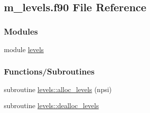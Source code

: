 \hypertarget{m__levels_8f90}{}\subsection{m\+\_\+levels.\+f90 File Reference}
\label{m__levels_8f90}
\subsubsection*{Modules}
\begin{DoxyCompactItemize}
\item 
module \hyperlink{namespacelevels}{levels}
\end{DoxyCompactItemize}
\subsubsection*{Functions/\+Subroutines}
\begin{DoxyCompactItemize}
\item 
subroutine \hyperlink{namespacelevels_ab6baa988e04debfb3d1dccc8918168e6}{levels\+::alloc\+\_\+levels} (npsi)
\item 
subroutine \hyperlink{namespacelevels_a9f2cce4a9f7a1adf27d37ad06fd21bb4}{levels\+::dealloc\+\_\+levels}
\end{DoxyCompactItemize}
